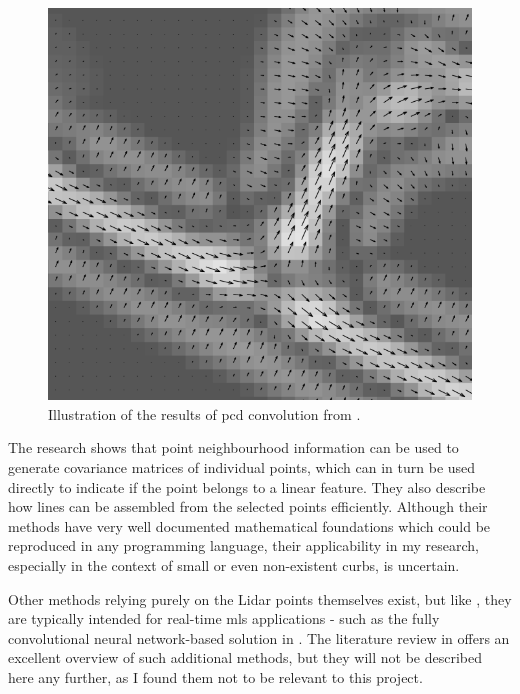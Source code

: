 \begin{figure}
    \includegraphics[width=\linewidth]{final_report/figs/clode_etal_2007_01.png} 
    \caption{Illustration of the results of \ac{pcd} convolution from \cite{clode_etal_2007}.}
    \label{fig:phasecodeddisk}
\end{figure}

The research \cite{gross_thoennessen_2006} shows that point neighbourhood information can be used to generate covariance matrices of individual points, which can in turn be used directly to indicate if the point belongs to a linear feature. They also describe how lines can be assembled from the selected points efficiently. Although their methods have very well documented mathematical foundations which could be reproduced in any programming language, their applicability in my research, especially in the context of small or even non-existent curbs, is uncertain.

Other methods relying purely on the Lidar points themselves exist, but like \cite{zhang_2010}, they are typically intended for real-time \ac{mls} applications - such as the fully convolutional neural network-based solution in \cite{caltagirone_etal_2017}. The literature review in \cite{yang_etal_2013} offers an excellent overview of such additional methods, but they will not be described here any further, as I found them not to be relevant to this project.

